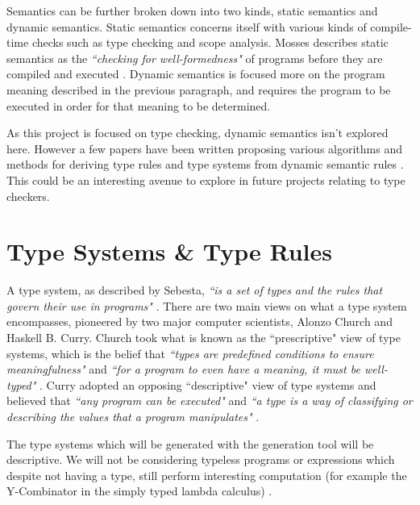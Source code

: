 \documentclass{UoYCSproject}
\begin{document}
Semantics can be further broken down into two kinds, static semantics and
dynamic semantics. Static semantics concerns itself with various kinds
of compile-time checks such as type checking and scope analysis. Mosses
describes static semantics as the \textit{``checking for well-formedness"} of
programs before they are compiled and executed \cite{Mosses}. Dynamic
semantics is focused more on the program meaning described in the previous
paragraph, and requires the program to be executed in order for that meaning to
be determined.

As this project is focused on type checking, dynamic semantics
isn't explored here. However a few papers have been written
proposing various algorithms and methods for deriving type rules and type
systems from dynamic semantic rules \cite{NeilJones} \cite{JohnHannan}. This could
be an interesting avenue to explore in future projects relating to type checkers.

\section{Type Systems \& Type Rules}
\label{sec:Chap1TypeSystems}

A type system, as described by Sebesta, \textit{``is a set of types and the rules that
    govern their use in programs"} \cite[\S6.15, p.~309]{Sebesta}.
There are two main views on what a type system encompasses, pioneered by two
major computer scientists, Alonzo Church and Haskell B. Curry.
Church took what is known as the ``prescriptive" view of type systems, which is
the belief that \textit{``types are predefined conditions to ensure meaningfulness"}
and \textit{``for a program to even have a meaning, it must be well-typed"}
\cite{NeilJones}. Curry adopted an opposing ``descriptive" view of type systems
and believed that \textit{``any program can be executed"} and \textit{``a type
    is a way of classifying or describing the values that a program manipulates"}
\cite{NeilJones}.

The type systems which will be generated with the generation tool will be
descriptive. We will not be considering typeless programs or expressions which
despite not having a type, still perform interesting computation (for example
the Y-Combinator in the simply typed lambda calculus) \cite{NeilJones} 
\cite[p.~28]{SimonPeytonJones} \cite[p.~155]{SimonPeytonJones}.
\end{document}
